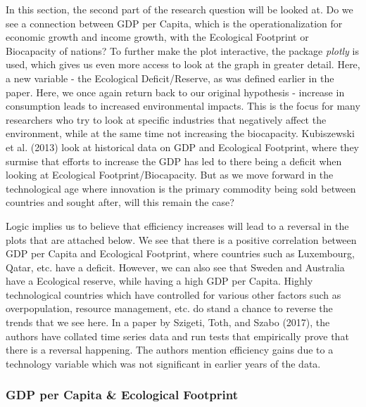 \documentclass[
]{article}
\begin{document}
In this section, the second part of the research question will be looked
at. Do we see a connection between GDP per Capita, which is the
operationalization for economic growth and income growth, with the
Ecological Footprint or Biocapacity of nations? To further make the plot
interactive, the package \emph{plotly} is used, which gives us even more
access to look at the graph in greater detail. Here, a new variable -
the Ecological Deficit/Reserve, as was defined earlier in the paper.
Here, we once again return back to our original hypothesis - increase in
consumption leads to increased environmental impacts. This is the focus
for many researchers who try to look at specific industries that
negatively affect the environment, while at the same time not increasing
the biocapacity. Kubiszewski et al. (2013) look at historical data on
GDP and Ecological Footprint, where they surmise that efforts to
increase the GDP has led to there being a deficit when looking at
Ecological Footprint/Biocapacity. But as we move forward in the
technological age where innovation is the primary commodity being sold
between countries and sought after, will this remain the case?

Logic implies us to believe that efficiency increases will lead to a
reversal in the plots that are attached below. We see that there is a
positive correlation between GDP per Capita and Ecological Footprint,
where countries such as Luxembourg, Qatar, etc. have a deficit. However,
we can also see that Sweden and Australia have a Ecological reserve,
while having a high GDP per Capita. Highly technological countries which
have controlled for various other factors such as overpopulation,
resource management, etc. do stand a chance to reverse the trends that
we see here. In a paper by Szigeti, Toth, and Szabo (2017), the authors
have collated time series data and run tests that empirically prove that
there is a reversal happening. The authors mention efficiency gains due
to a technology variable which was not significant in earlier years of
the data.

\hypertarget{gdp-per-capita-ecological-footprint}{%
\subsubsection{GDP per Capita \& Ecological
Footprint}\label{gdp-per-capita-ecological-footprint}}
\end{document}
